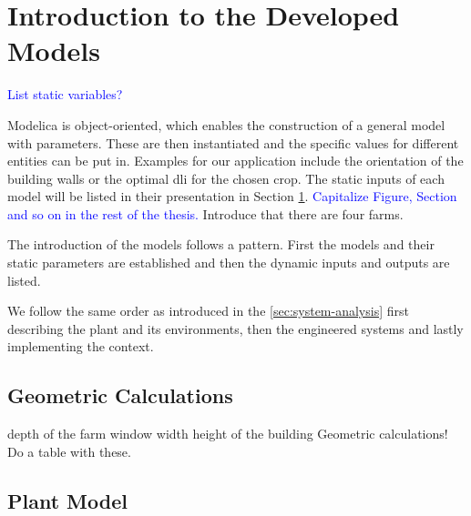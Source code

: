 \section{Introduction to the Developed Models}
\label{sec:intro-to-models}
\textcolor{Blue}{List static variables?}

Modelica is object-oriented, which enables the construction of a general model with parameters.
These are then instantiated and the specific values for different entities can be put in.
Examples for our application include the orientation of the building walls or the optimal \ac{dli} for the chosen crop.
The static inputs of each model will be listed in their presentation in Section \ref{sec:intro-to-models}.
\textcolor{Blue}{Capitalize Figure, Section and so on in the rest of the thesis.}
Introduce that there are four farms.

The introduction of the models follows a pattern.
First the models and their static parameters are established and then the dynamic inputs and outputs are listed.

We follow the same order as introduced in the \ref{sec:system-analysis} first describing the plant and its environments, then the engineered systems and lastly implementing the context.

\subsection{Geometric Calculations}
depth of the farm  window width height of the building
Geometric calculations!
Do a table with these.

\subsection{Plant Model}

